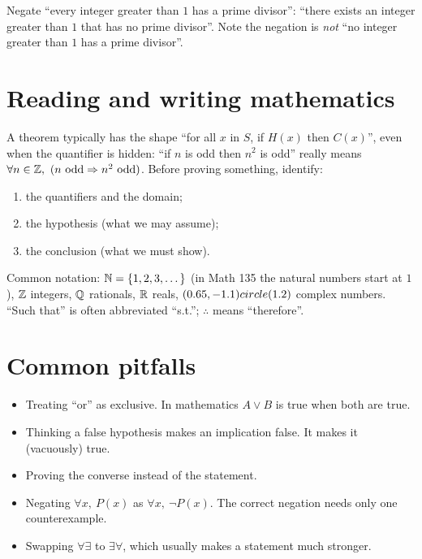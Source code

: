 \begin{example}
Negate ``every integer greater than $1$ has a prime divisor'': ``there exists an integer
greater than $1$ that has no prime divisor''. Note the negation is \emph{not} ``no integer
greater than $1$ has a prime divisor''.
\end{example}

\section{Reading and writing mathematics}

A theorem typically has the shape ``for all $x$ in $S$, if $H(x)$ then $C(x)$'', even when the
quantifier is hidden: ``if $n$ is odd then $n^2$ is odd'' really means
$\forall n \in \mathbb{Z},\ (n \text{ odd} \Rightarrow n^2 \text{ odd})$. Before proving something,
identify:
\begin{enumerate}
  \item the quantifiers and the domain;
  \item the hypothesis (what we may assume);
  \item the conclusion (what we must show).
\end{enumerate}

\begin{aside}
Common notation: $\mathbb{N} = \{1,2,3,\dots\}$ (in Math 135 the natural numbers start at $1$),
$\mathbb{Z}$ integers, $\mathbb{Q}$ rationals, $\mathbb{R}$ reals, $(0.65,-1.1) circle (1.2)$ complex numbers. ``Such that'' is often
abbreviated ``s.t.''; $\therefore$ means ``therefore''.
\end{aside}

\section{Common pitfalls}
\begin{itemize}
  \item Treating ``or'' as exclusive. In mathematics $A \vee B$ is true when both are true.
  \item Thinking a false hypothesis makes an implication false. It makes it (vacuously) true.
  \item Proving the converse instead of the statement.
  \item Negating $\forall x,\ P(x)$ as $\forall x,\ \neg P(x)$. The correct negation needs only
        one counterexample.
  \item Swapping $\forall\exists$ to $\exists\forall$, which usually makes a statement much
        stronger.
\end{itemize}

